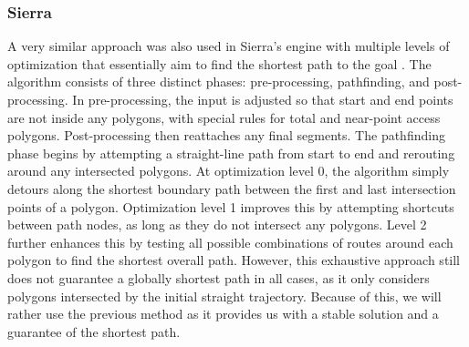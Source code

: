 \subsubsection{Sierra}
A very similar approach was also used in Sierra's engine with multiple levels of optimization that essentially aim to find the shortest path to the goal \cite{ScummVM-patent}. The algorithm consists of three distinct phases: pre-processing, pathfinding, and post-processing. In pre-processing, the input is adjusted so that start and end points are not inside any polygons, with special rules for total and near-point access polygons. Post-processing then reattaches any final segments. The pathfinding phase begins by attempting a straight-line path from start to end and rerouting around any intersected polygons. At optimization level 0, the algorithm simply detours along the shortest boundary path between the first and last intersection points of a polygon. Optimization level 1 improves this by attempting shortcuts between path nodes, as long as they do not intersect any polygons. Level 2 further enhances this by testing all possible combinations of routes around each polygon to find the shortest overall path. However, this exhaustive approach still does not guarantee a globally shortest path in all cases, as it only considers polygons intersected by the initial straight trajectory. Because of this, we will rather use the previous method as it provides us with a stable solution and a guarantee of the shortest path.



